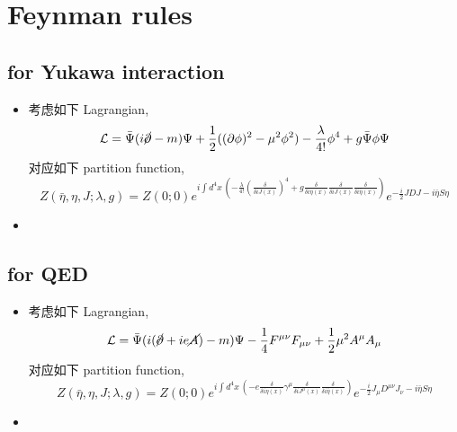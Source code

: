 \section{Feynman rules}
\subsection{for Yukawa interaction}
\begin{itemize}
	\item 考虑如下 Lagrangian,
	\begin{equation}
		\mathcal{L} = \bar{\Psi} (i \cancel{\partial} - m) \Psi + \frac{1}{2} ((\partial \phi)^2 - \mu^2 \phi^2) - \frac{\lambda}{4!} \phi^4 + g \bar{\Psi} \phi \Psi
	\end{equation}
	对应如下 partition function,
	\begin{equation}
		Z(\bar{\eta}, \eta, J; \lambda, g) = Z(0; 0) e^{i \int d^4 x \, (- \frac{\lambda}{4!} (\frac{\delta}{\delta i J(x)})^4 + g \frac{\delta}{\delta i \eta(x)} \frac{\delta}{\delta i J(x)} \frac{\delta}{\delta i \bar{\eta}(x)})} e^{- \frac{i}{2} J D J - i \bar{\eta} S \eta}
	\end{equation}
	
	\item 
\end{itemize}

\subsection{for QED}
\begin{itemize}
	\item 考虑如下 Lagrangian,
	\begin{equation}
		\mathcal{L} = \bar{\Psi} (i (\cancel{\partial} + i e \cancel{A}) - m) \Psi - \frac{1}{4} F^{\mu \nu} F_{\mu \nu} + \frac{1}{2} \mu^2 A^\mu A_\mu
	\end{equation}
	对应如下 partition function,
	\begin{equation}
		Z(\bar{\eta}, \eta, J; \lambda, g) = Z(0; 0) e^{i \int d^4 x \, (- e \frac{\delta}{\delta i \eta(x)} \gamma^\mu \frac{\delta}{\delta i J^\mu(x)} \frac{\delta}{\delta i \bar{\eta}(x)})} e^{- \frac{i}{2} J_\mu D^{\mu \nu} J_\nu - i \bar{\eta} S \eta}
	\end{equation}
	
	\item 
\end{itemize}
